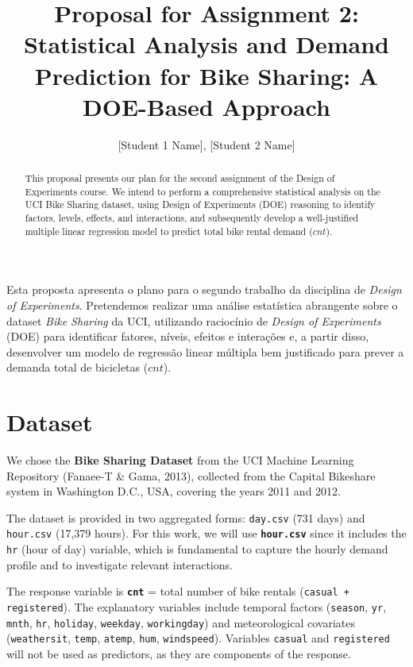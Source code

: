 \documentclass[12pt]{article}
\title{Proposal for Assignment 2: Statistical Analysis and Demand Prediction for Bike Sharing: A DOE-Based Approach}
\author{[Student 1 Name]\inst{1}, [Student 2 Name]\inst{1}}
\begin{document}
\maketitle

\begin{abstract}
This proposal presents our plan for the second assignment of the Design of Experiments course. We intend to perform a comprehensive statistical analysis on the UCI Bike Sharing dataset, using Design of Experiments (DOE) reasoning to identify factors, levels, effects, and interactions, and subsequently develop a well-justified multiple linear regression model to predict total bike rental demand ($cnt$).
\end{abstract}

\begin{resumo}
Esta proposta apresenta o plano para o segundo trabalho da disciplina de \textit{Design of Experiments}. Pretendemos realizar uma análise estatística abrangente sobre o dataset \textit{Bike Sharing} da UCI, utilizando raciocínio de \textit{Design of Experiments} (DOE) para identificar fatores, níveis, efeitos e interações e, a partir disso, desenvolver um modelo de regressão linear múltipla bem justificado para prever a demanda total de bicicletas ($cnt$).
\end{resumo}

\section{Dataset}

We chose the \textbf{Bike Sharing Dataset} from the UCI Machine Learning Repository (Fanaee-T \& Gama, 2013), collected from the Capital Bikeshare system in Washington D.C., USA, covering the years 2011 and 2012.

The dataset is provided in two aggregated forms: \texttt{day.csv} (731 days) and \texttt{hour.csv} (17,379 hours). For this work, we will use \textbf{\texttt{hour.csv}} since it includes the \texttt{hr} (hour of day) variable, which is fundamental to capture the hourly demand profile and to investigate relevant interactions.

The response variable is \textbf{\texttt{cnt}} = total number of bike rentals (\texttt{casual + registered}). The explanatory variables include temporal factors (\texttt{season}, \texttt{yr}, \texttt{mnth}, \texttt{hr}, \texttt{holiday}, \texttt{weekday}, \texttt{workingday}) and meteorological covariates (\texttt{weathersit}, \texttt{temp}, \texttt{atemp}, \texttt{hum}, \texttt{windspeed}). Variables \texttt{casual} and \texttt{registered} will not be used as predictors, as they are components of the response.
\end{document}
